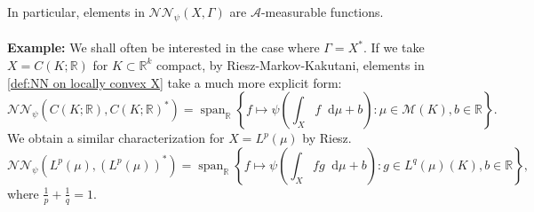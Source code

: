 \documentclass[11pt,a4paper,twoside,openany]{report}
\newcommand{\diff}{\mathop{}\!\mathrm{d}}
\theoremstyle{plain} %
\theoremstyle{definition} %
\theoremstyle{remark} %
\begin{document}
In particular, elements in \(\mathcal{NN}_{\psi}(X,\Gamma)\) are \(\mathcal{A}\)-measurable functions.
\\\\
\textbf{Example:} We shall often be interested in the case where \(\Gamma=X^*\). If we take \(X=C(K;\mathbb{R})\) for \(K\subset\mathbb{R}^k\) compact, by Riesz-Markov-Kakutani, elements in \cref{def:NN on locally convex X} take a much more explicit form:
\begin{equation}
     \mathcal{NN}_{\psi}(C(K;\mathbb{R}),C(K;\mathbb{R})^*)=\operatorname{span}_{\mathbb{R}}\left\{f\mapsto\psi(\int_X f\diff \mu+b):\mu\in\mathcal{M}(K),b\in\mathbb{R}\right\}.
\end{equation}
We obtain a similar characterization for \(X=L^p(\mu)\) by Riesz. 
\begin{equation}
     \mathcal{NN}_{\psi}(L^p(\mu),(L^p(\mu))^*)=\operatorname{span}_{\mathbb{R}}\left\{f\mapsto\psi(\int_X fg\diff \mu+b):g\in L^q(\mu)(K),b\in\mathbb{R}\right\},
\end{equation}
where \(\frac{1}{p}+\frac{1}{q}=1\).
\end{document}
